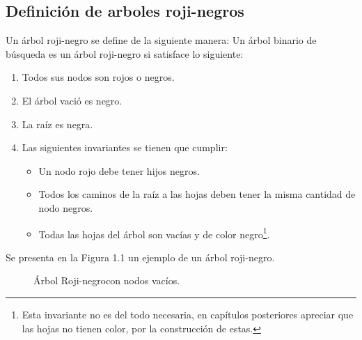 \documentclass[8pt,leqno,pdflatex,spanish]{book}
\newcommand{\Arn}{Árbol Roji-negro}
\newcommand{\arn}{árbol roji-negro}
\newcommand{\arns}{arboles roji-negros}
\theoremstyle{plain}
\theoremstyle{definition}
\theoremstyle{remark}
\begin{document}
\subsection{Definici\'on de {\arns}}
Un {\arn} se define de la siguiente manera:
Un \'arbol binario de búsqueda es un {\arn} si satisface lo siguiente:
\begin{enumerate}
    \item Todos sus nodos son rojos o negros.
    \item El \'arbol vació es negro.
    \item La raíz es negra.
    \item Las siguientes invariantes se tienen que cumplir:
    \begin{itemize}
        \item Un nodo rojo debe tener hijos negros.
        \item Todos los caminos de la raíz a las hojas deben tener la misma cantidad de nodo 
        negros.
        \item Todas las hojas del \'arbol son vacías y de color negro\footnote{Esta invariante no 
        es del todo necesaria, en capítulos posteriores apreciar que las hojas no tienen color, 
        por la construcción de estas.}.
    \end{itemize}
\end{enumerate}

Se presenta en la Figura 1.1 un ejemplo de un {\arn}.

\begin{figure}
\centering 
\captionsetup{justification=centering}
\label{arbolRB}
\caption {\Arn con nodos vac\'ios.}
\end{figure}
\end{document}
